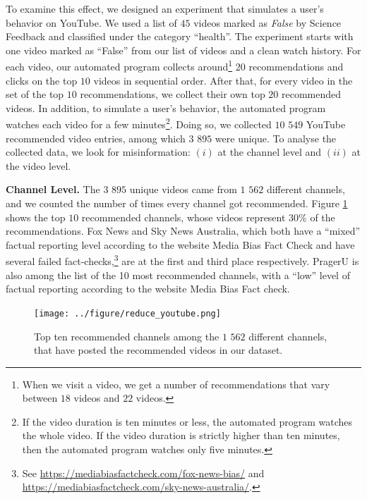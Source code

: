 \documentclass{article}
\begin{document}
To examine this effect, we designed an experiment that simulates a user's behavior on YouTube. 
We used a list of $45$ videos marked as {\it False} by Science Feedback and classified under the category ``health''.
The experiment starts with one video marked as ``False'' from our list of videos and a clean watch history.
For each video, our automated program collects around\footnote{When we visit a video, we get a number of recommendations that vary between $18$ videos and $22$ videos.}
$20$ recommendations and clicks on the top $10$ videos in sequential order. 
After that, for every video in the set of the top $10$ recommendations, we collect their own top $20$ recommended videos.
In addition, to simulate a user's behavior, the automated program watches each video for a few minutes\footnote{If the video duration is ten minutes or less, the automated program watches the whole video. If the video duration is strictly higher than ten minutes, then the automated program watches only five minutes.}.
Doing so, we collected $10$ $549$ YouTube recommended video entries, among which $3$ $895$ were unique. 
To analyse the collected data, we look for misinformation: $(i)$ at the channel level and $(ii)$ at the video level. 

\smallskip

{\bf Channel Level.} 
The $3$ $895$ unique videos came from $1$ $562$ different channels, and we counted the number of times every channel got recommended.
Figure \ref{reduce_youtube} shows the top $10$ recommended channels, whose videos represent $30\%$ of the recommendations.
Fox News and Sky News Australia, which both have a ``mixed'' factual reporting level according to the website Media Bias Fact Check and have several failed fact-checks,\footnote{See \href{https://mediabiasfactcheck.com/fox-news-bias/}{https://mediabiasfactcheck.com/fox-news-bias/} and \href{https://mediabiasfactcheck.com/sky-news-australia/}{https://mediabiasfactcheck.com/sky-news-australia/}.} are at the first and third place respectively.
PragerU is also among the list of the 10 most recommended channels, with a ``low'' level of factual reporting according to the website Media Bias Fact check. 
\smallskip 

\begin{figure}[h]
	\begin{center}
		\texttt{[image: ../figure/reduce\_youtube.png]} 
	\end{center}
	\caption{Top ten recommended channels among the $1$ $562$ different channels, that have posted the recommended videos in our dataset.}
	\label{reduce_youtube}
\end{figure}
\end{document}
